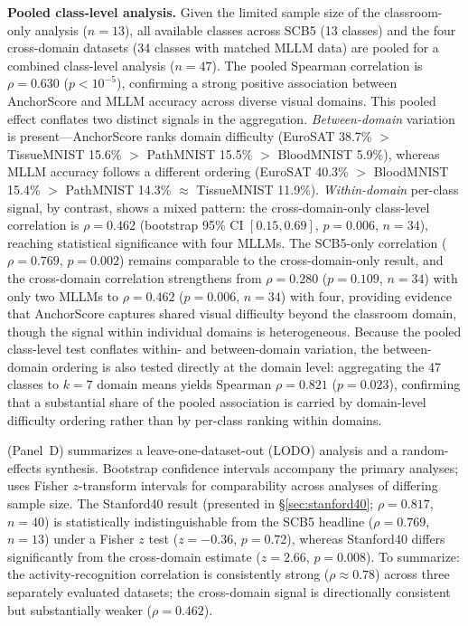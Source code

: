 \documentclass[11pt,a4paper]{article}
\begin{document}
\textbf{Pooled class-level analysis.} Given the limited sample size of the classroom-only analysis ($n=13$), all available classes across SCB5 (13 classes) and the four cross-domain datasets (34 classes with matched MLLM data) are pooled for a combined class-level analysis ($n=47$). The pooled Spearman correlation is $\rho=0.630$ ($p<10^{-5}$), confirming a strong positive association between AnchorScore and MLLM accuracy across diverse visual domains. This pooled effect conflates two distinct signals in the aggregation. \emph{Between-domain} variation is present---AnchorScore ranks domain difficulty (EuroSAT 38.7\% $>$ TissueMNIST 15.6\% $>$ PathMNIST 15.5\% $>$ BloodMNIST 5.9\%), whereas MLLM accuracy follows a different ordering (EuroSAT 40.3\% $>$ BloodMNIST 15.4\% $>$ PathMNIST 14.3\% $\approx$ TissueMNIST 11.9\%). \emph{Within-domain} per-class signal, by contrast, shows a mixed pattern: the cross-domain-only class-level correlation is $\rho=0.462$ (bootstrap 95\% CI $[0.15, 0.69]$, $p=0.006$, $n=34$), reaching statistical significance with four MLLMs. The SCB5-only correlation ($\rho=0.769$, $p=0.002$) remains comparable to the cross-domain-only result, and the cross-domain correlation strengthens from $\rho=0.280$ ($p=0.109$, $n=34$) with only two MLLMs to $\rho=0.462$ ($p=0.006$, $n=34$) with four, providing evidence that AnchorScore captures shared visual difficulty beyond the classroom domain, though the signal within individual domains is heterogeneous. Because the pooled class-level test conflates within- and between-domain variation, the between-domain ordering is also tested directly at the domain level: aggregating the 47 classes to $k=7$ domain means yields Spearman $\rho=0.821$ ($p=0.023$), confirming that a substantial share of the pooled association is carried by domain-level difficulty ordering rather than by per-class ranking within domains.

 (Panel~D) summarizes a leave-one-dataset-out (LODO) analysis and a random-effects synthesis. Bootstrap confidence intervals accompany the primary analyses;  uses Fisher $z$-transform intervals for comparability across analyses of differing sample size. The Stanford40 result (presented in \S\ref{sec:stanford40}; $\rho=0.817$, $n=40$) is statistically indistinguishable from the SCB5 headline ($\rho=0.769$, $n=13$) under a Fisher $z$ test ($z=-0.36$, $p=0.72$), whereas Stanford40 differs significantly from the cross-domain estimate ($z=2.66$, $p=0.008$). To summarize: the activity-recognition correlation is consistently strong ($\rho\approx0.78$) across three separately evaluated datasets; the cross-domain signal is directionally consistent but substantially weaker ($\rho=0.462$).
\end{document}
